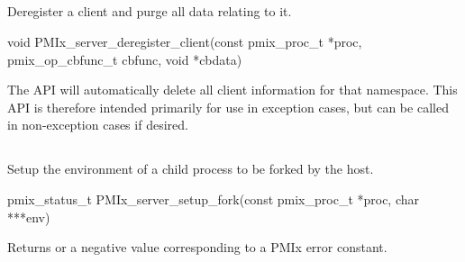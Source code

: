 \subsection{}

\summary

Deregister a client and purge all data relating to it.

\format

\cspecificstart
\begin{codepar}
void PMIx_server_deregister_client(const pmix_proc_t *proc,
                                   pmix_op_cbfunc_t cbfunc, void *cbdata)
\end{codepar}
\cspecificend

\begin{arglist}
\end{arglist}


\descr

The  API will automatically delete all client information for that namespace.
This API is therefore intended primarily for use in exception cases, but can be called in non-exception cases if desired.


\subsection{}

\summary

Setup the environment of a child process to be forked by the host.

\format

\cspecificstart
\begin{codepar}
pmix_status_t PMIx_server_setup_fork(const pmix_proc_t *proc, char ***env)
\end{codepar}
\cspecificend

\begin{arglist}
\end{arglist}

Returns  or a negative value corresponding to a PMIx error constant.

